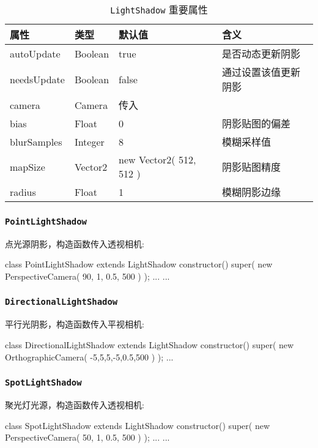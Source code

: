 \begin{table}[H]
  \centering
  \small
  \caption{\texttt{LightShadow} 重要属性}
  \setlength{\tabcolsep}{4mm}
  \begin{tabular}{l|l|l|l}
    \toprule
    \textbf{属性} & \textbf{类型} & \textbf{默认值} & \textbf{含义} \\
    \midrule
    autoUpdate & Boolean & true & 是否动态更新阴影 \\
    needsUpdate & Boolean & false & 通过设置该值更新阴影 \\
    camera & Camera & 传入 &  \\
    bias & Float & 0 & 阴影贴图的偏差 \\
    blurSamples & Integer & 8 & 模糊采样值 \\
    mapSize & Vector2 & new Vector2( 512, 512 ) & 阴影贴图精度 \\
    radius & Float & 1 & 模糊阴影边缘 \\
    \bottomrule
  \end{tabular}
\end{table}

\subsubsection*{\texttt{PointLightShadow}}

点光源阴影，构造函数传入透视相机:

\begin{JavaScript}
class PointLightShadow extends LightShadow {
	constructor() {
    super( new PerspectiveCamera( 90, 1, 0.5, 500 ) );
    ...
  }
  ...
}
\end{JavaScript}

\subsubsection*{\texttt{DirectionalLightShadow}}

平行光阴影，构造函数传入平视相机:

\begin{JavaScript}
class DirectionalLightShadow extends LightShadow {
	constructor() {
		super( new OrthographicCamera( -5,5,5,-5,0.5,500 ) );
    ...
	}
}
\end{JavaScript}

\subsubsection*{\texttt{SpotLightShadow}}

聚光灯光源，构造函数传入透视相机:

\begin{JavaScript}
class SpotLightShadow extends LightShadow {
  constructor() {
    super( new PerspectiveCamera( 50, 1, 0.5, 500 ) );
    ...
  }
  ...
}
\end{JavaScript}